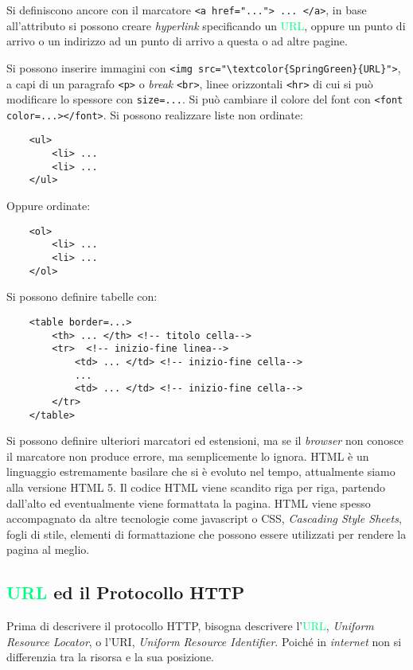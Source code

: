 \documentclass{article}
\numberwithin{equation}{subsection}
\begin{document}
Si definiscono ancore con il marcatore \verb|<a href="..."> ... </a>|, in base all'attributo si possono creare \textit{hyperlink} specificando un \textcolor{SpringGreen}{URL}, oppure un punto di arrivo o un indirizzo ad un punto di arrivo a questa o ad altre pagine. 

Si possono inserire immagini con \verb|<img src="\textcolor{SpringGreen}{URL}">|, a capi di un paragrafo \verb|<p>| o \textit{break} \verb|<br>|, linee orizzontali \verb|<hr>| di cui si può modificare 
lo spessore con \verb|size=...|. Si può cambiare il colore del font con \verb|<font color=...></font>|. 
Si possono realizzare liste non ordinate:
\begin{verbatim}
    <ul>
        <li> ...
        <li> ...
    </ul>
\end{verbatim}
Oppure ordinate:
\begin{verbatim}
    <ol>
        <li> ...
        <li> ...
    </ol>
\end{verbatim}
Si possono definire tabelle con:
\begin{verbatim}
    <table border=...>
        <th> ... </th> <!-- titolo cella-->
        <tr>  <!-- inizio-fine linea-->
            <td> ... </td> <!-- inizio-fine cella-->
            ...
            <td> ... </td> <!-- inizio-fine cella-->
        </tr> 
    </table>
\end{verbatim}

Si possono definire ulteriori marcatori ed estensioni, ma se il \textit{browser} non conosce il marcatore non produce errore, ma semplicemente lo ignora. 
\textcolor{Peach}{HTML} è un linguaggio estremamente basilare che si è evoluto nel tempo, attualmente siamo alla versione \textcolor{Peach}{HTML} 5. 
Il codice \textcolor{Peach}{HTML} viene scandito riga per riga, partendo dall'alto ed eventualmente viene formattata la pagina. \textcolor{Peach}{HTML} viene spesso accompagnato da altre tecnologie come 
javascript o CSS, \textit{Cascading Style Sheets}, fogli di stile, elementi di formattazione che possono essere utilizzati per rendere la pagina al meglio. 

\subsection{\textcolor{SpringGreen}{URL} ed il Protocollo \textcolor{NavyBlue}{HTTP}}

Prima di descrivere il protocollo \textcolor{NavyBlue}{HTTP}, bisogna descrivere l'\textcolor{SpringGreen}{URL}, \textit{Uniform Resource Locator}, o l'URI, \textit{Uniform Resource Identifier}. Poiché in \textit{internet} non si differenzia tra la risorsa e la sua posizione. 
\end{document}
